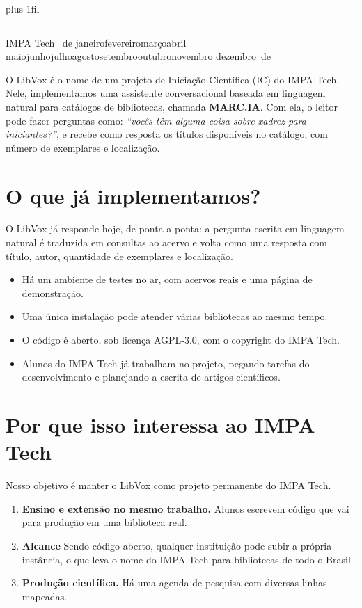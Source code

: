 \documentclass[11pt,a4paper]{article}
\newcommand{\mesbr}{\ifcase\month\or janeiro\or fevereiro\or março\or abril\or
  maio\or junho\or julho\or agosto\or setembro\or outubro\or novembro\or
  dezembro\fi}
\newcommand{\databr}{\number\day\ de \mesbr\ de \number\year}
\newcommand{\caixacheia}{\parfillskip=0pt plus 1fil\relax}
\newcommand{\titulo}{%
  \noindent{\sffamily\LARGE\bfseries Plano de implantação do LibVox}\par
  \vspace{0.35em}
  {\caixacheia\color{marcia}\rule{\linewidth}{1.2pt}\par}
  \vspace{0.4em}
  {\sffamily\small\color{suave} IMPA Tech \quad\textbullet\quad \databr}\par
  \vspace{1.6\baselineskip}}
\begin{document}
\titulo

O LibVox é o nome de um projeto de Iniciação Científica (IC) do IMPA Tech. Nele, implementamos uma assistente conversacional baseada em linguagem natural para catálogos de bibliotecas, chamada \textbf{MARC.IA}. Com ela, o leitor pode fazer perguntas como: \emph{``vocês têm alguma coisa sobre xadrez para iniciantes?''}, e recebe como resposta os títulos disponíveis no catálogo, com número de exemplares e localização.

\section{O que já implementamos?}

O LibVox já responde hoje, de ponta a ponta: a pergunta escrita em linguagem
natural é traduzida em consultas ao acervo e volta como uma resposta com título,
autor, quantidade de exemplares e localização.

\begin{itemize}
  \item Há um ambiente de testes no ar, com acervos reais e uma página
        de demonstração.
  \item Uma única instalação pode atender várias bibliotecas ao mesmo tempo.
  \item O código é aberto, sob licença AGPL-3.0, com o copyright do IMPA Tech.
  \item Alunos do IMPA Tech já trabalham no projeto, pegando tarefas do
        desenvolvimento e planejando a escrita de artigos científicos. 
\end{itemize}

\section{Por que isso interessa ao IMPA Tech}

Nosso objetivo é manter o LibVox como projeto permanente do IMPA Tech.

\begin{enumerate}
  \item \textbf{Ensino e extensão no mesmo trabalho.} Alunos escrevem código
        que vai para produção em uma biblioteca real.
  \item \textbf{Alcance} Sendo código aberto, qualquer
        instituição pode subir a própria instância, o que leva o nome do 
        IMPA Tech para bibliotecas de todo o Brasil.
  \item \textbf{Produção científica.} Há uma agenda de pesquisa com diversas linhas mapeadas.
\end{enumerate}
\end{document}

